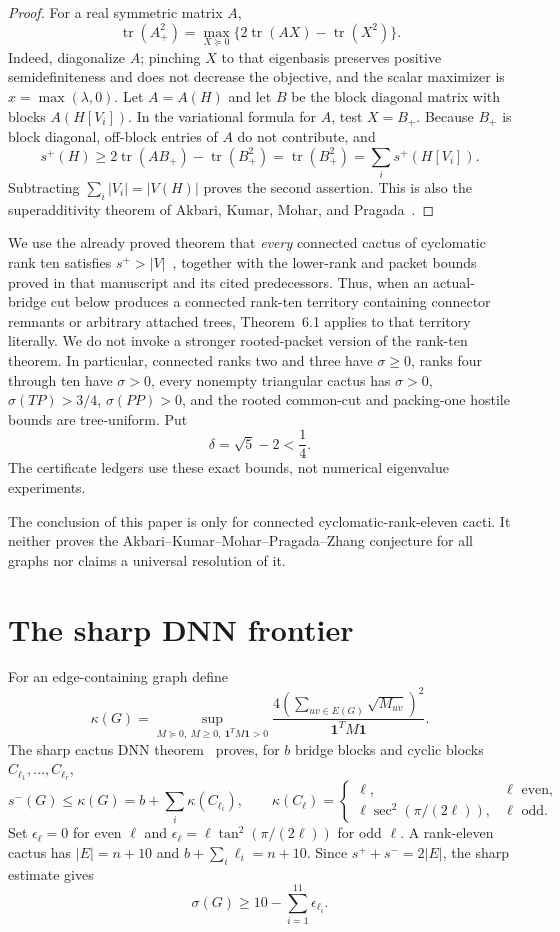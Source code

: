 \documentclass[11pt]{article}
\theoremstyle{remark}
\newcommand{\spE}{s^+}
\newcommand{\smE}{s^-}
\newcommand{\sig}{\sigma}
\newcommand{\one}{\mathbf 1}
\begin{document}
\begin{proof}
For a real symmetric matrix $A$,
\[
 \operatorname{tr}(A_+^2)=
 \max_{X\succeq0}\{2\operatorname{tr}(AX)-\operatorname{tr}(X^2)\}.
\]
Indeed, diagonalize $A$; pinching $X$ to that eigenbasis preserves positive
semidefiniteness and does not decrease the objective, and the scalar maximizer
is $x=\max(\lambda,0)$.  Let $A=A(H)$ and let $B$ be the block diagonal matrix
with blocks $A(H[V_i])$.  In the variational formula for $A$, test $X=B_+$.
Because $B_+$ is block diagonal, off-block entries of $A$ do not contribute,
and
\[
 \spE(H)\geq2\operatorname{tr}(AB_+)-\operatorname{tr}(B_+^2)
 =\operatorname{tr}(B_+^2)=\sum_i\spE(H[V_i]).
\]
Subtracting $\sum_i|V_i|=|V(H)|$ proves the second assertion.  This is also the
superadditivity theorem of Akbari, Kumar, Mohar, and Pragada~\cite{AKMP}.
\end{proof}

We use the already proved theorem that \emph{every} connected cactus of
cyclomatic rank ten satisfies $\spE>|V|$~\cite[Theorem~6.1]{RankTen}, together
with the lower-rank and packet bounds proved in that manuscript and its cited
predecessors.  Thus, when an actual-bridge cut below produces a connected
rank-ten territory containing connector remnants or arbitrary attached trees,
Theorem~6.1 applies to that territory literally.  We do not invoke a stronger
rooted-packet version of the rank-ten theorem.  In particular, connected ranks
two and three have
$\sig\geq0$, ranks four through ten have $\sig>0$, every nonempty triangular
cactus has $\sig>0$, $\sig(TP)>3/4$, $\sig(PP)>0$, and the rooted common-cut
and packing-one hostile bounds are tree-uniform.  Put
\[
 \delta=\sqrt5-2<\frac14.
\]
The certificate ledgers use these exact bounds, not numerical eigenvalue
experiments.

The conclusion of this paper is only for connected cyclomatic-rank-eleven
cacti.  It neither proves the Akbari--Kumar--Mohar--Pragada--Zhang conjecture
for all graphs nor claims a universal resolution of it.

\section{The sharp DNN frontier}

For an edge-containing graph define
\[
 \kappa(G)=\sup_{M\succeq0,\ M\geq0,\ \one^TM\one>0}
 \frac{4(\sum_{uv\in E(G)}\sqrt{M_{uv}})^2}{\one^TM\one}.
\]
The sharp cactus DNN theorem~\cite{DNN,LTZ} proves, for $b$ bridge blocks and
cyclic blocks $C_{\ell_1},\ldots,C_{\ell_r}$,
\[
 \smE(G)\leq\kappa(G)=b+\sum_i\kappa(C_{\ell_i}),\qquad
 \kappa(C_\ell)=
 \begin{cases}
  \ell,&\ell\text{ even},\\
  \ell\sec^2(\pi/(2\ell)),&\ell\text{ odd}.
 \end{cases}
\]
Set $\epsilon_\ell=0$ for even $\ell$ and
$\epsilon_\ell=\ell\tan^2(\pi/(2\ell))$ for odd $\ell$.  A rank-eleven cactus
has $|E|=n+10$ and $b+\sum_i\ell_i=n+10$.  Since
$\spE+\smE=2|E|$, the sharp estimate gives
\begin{equation}\label{eq:dnn}
 \sig(G)\geq10-\sum_{i=1}^{11}\epsilon_{\ell_i}.
\end{equation}
\end{document}
